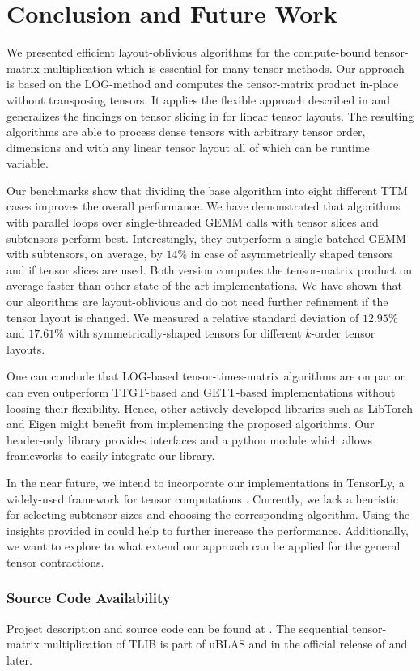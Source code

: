 \section{Conclusion and Future Work}
\label{sec:conclusion}
We presented efficient layout-oblivious algorithms for the compute-bound tensor-matrix multiplication which is essential for many tensor methods.
Our approach is based on the LOG-method and computes the tensor-matrix product in-place without transposing tensors.
It applies the flexible approach described in \cite{bassoy:2019:ttv} and generalizes the findings on tensor slicing in \cite{li:2015:input} for linear tensor layouts.
The resulting algorithms are able to process dense tensors with arbitrary tensor order, dimensions and with any linear tensor layout all of which can be runtime variable.

Our benchmarks show that dividing the base algorithm into eight different TTM cases improves the overall performance.
We have demonstrated that algorithms with parallel loops over single-threaded GEMM calls with tensor slices and subtensors perform best.
Interestingly, they outperform a single batched GEMM with subtensors, on average, by $14$\% in case of asymmetrically shaped tensors and if tensor slices are used.
Both version computes the tensor-matrix product on average faster than other state-of-the-art implementations.
We have shown that our algorithms are layout-oblivious and do not need further refinement if the tensor layout is changed. 
We measured a relative standard deviation of $12.95$\% and $17.61$\% with symmetrically-shaped tensors for different $k$-order tensor layouts.

One can conclude that LOG-based tensor-times-matrix algorithms are on par or can even outperform TTGT-based and GETT-based implementations without loosing their flexibility.
Hence, other actively developed libraries such as LibTorch and Eigen might benefit from implementing the proposed algorithms.
Our header-only library provides  interfaces and a python module which allows frameworks to easily integrate our library.

In the near future, we intend to incorporate our implementations in TensorLy, a widely-used framework for tensor computations \cite{cohen:2022:tensor.computations, kossaifi:2019:tensorly}.
Currently, we lack a heuristic for selecting subtensor sizes and choosing the corresponding algorithm. 
Using the insights provided in \cite{li:2015:input} could help to further increase the performance.
Additionally, we want to explore to what extend our approach can be applied for the general tensor contractions.

\subsubsection{Source Code Availability}
Project description and source code can be found at .
The sequential tensor-matrix multiplication of TLIB is part of uBLAS and in the official release of   and later.
